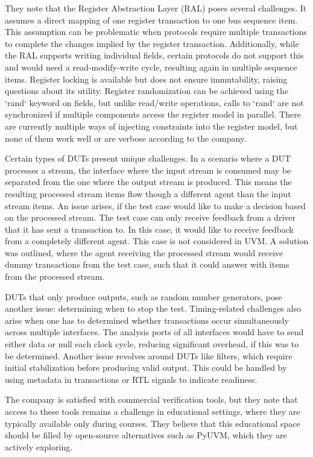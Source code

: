 \documentclass[12pt]{report}
\begin{document}
They note that the Register Abstraction Layer (RAL) poses several challenges. It assumes a direct mapping of one
register transaction to one bus sequence item. This assumption can be problematic when protocols require multiple
transactions to complete the changes implied by the register transaction. Additionally, while the RAL supports
writing individual fields, certain protocols do not support this and would need a read-modify-write cycle, resulting
again in multiple sequence items. Register locking is available but does not ensure immutability, raising questions
about its utility. Register randomization can be achieved using the `rand` keyword on fields, but unlike read/write
operations, calls to `rand` are not synchronized if multiple components access the register model in parallel. There
are currently multiple ways of injecting constraints into the register model, but none of them work well or are
verbose according to the company.

Certain types of DUTs present unique challenges. In a scenario where a DUT processes a stream, the interface where
the input stream is consumed may be separated from the one where the output stream is produced. This means the
resulting processed stream items flow though a different agent than the input stream items. An issue arises, if the
test case would like to make a decision based on the processed stream. The test case can only receive feedback from a
driver that it has sent a transaction to. In this case, it would like to receive feedback from a completely different
agent. This case is not considered in UVM. A solution was outlined, where the agent receiving the processed stream
would receive dummy transactions from the test case, such that it could answer with items from the processed stream.

DUTs that only produce outputs, such as random number generators, pose another issue: determining when to stop the
test. Timing-related challenges also arise when one has to determined whether transactions occur simultaneously
across multiple interfaces. The analysis ports of all interfaces would have to send either data or null each clock
cycle, reducing significant overhead, if this was to be determined. Another issue revolves around DUTs like filters,
which require initial stabilization before producing valid output. This could be handled by using metadata in
transactions or RTL signals to indicate readiness.

The company is satisfied with commercial verification tools, but they note that access to these tools remains a
challenge in educational settings, where they are typically available only during courses. They believe that this
educational space should be filled by open-source alternatives such as PyUVM, which they are actively exploring.
\end{document}
